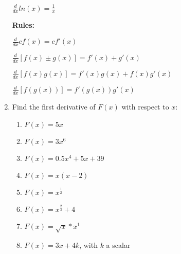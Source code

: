 \documentclass[11pt]{article}
\begin{document}
\begin{enumerate}
\begin{tcolorbox}[title= {\bf Helpful Derivative Formulae:}]
\begin{multicols}{2}
        \vspace{5mm}
        $\frac{d}{dx} ln(x) = \frac{1}{x}$ 


        \columnbreak

        {\bf Rules:}

        \vspace{5mm}
        $\frac{d}{dx} cf(x) = cf'(x)$

        \vspace{5mm}
        $\frac{d}{dx} [f(x) \pm g(x)] = f'(x) + g'(x)$

        \vspace{5mm}
        $\frac{d}{dx} [f(x) g(x)] = f'(x)g(x) + f(x)g'(x)$

        \vspace{5mm}
        $\frac{d}{dx} [f(g(x))] = f'(g(x)) g'(x)$
    \end{multicols}
    \vspace{-2mm}
  \end{tcolorbox}

  \item Find the first derivative of $F(x)$ with respect to $x$:
  \begin{multicols}{2}
    \begin{enumerate}
      \item $F(x) = 5x$
      
      \vspace{25mm}
      \item $F(x) = 3x^6$
      
      \vspace{25mm}
      \item $F(x) = 0.5x^4 + 5x + 39$
      
      \vspace{25mm}
      \item $F(x) = x(x-2)$
      
      \vspace{25mm}
      \item $F(x) = x^{\frac{1}{2}}$
      
      \vspace{25mm}
      \item $F(x) = x^{\frac{2}{3}} + 4$
      
      \vspace{25mm}
      \item $F(x) = \sqrt{x} * x^1$
      
      \vspace{25mm}
      \item $F(x) = 3x + 4k$, with $k$ a scalar
    \end{enumerate}
  \end{multicols}



\end{enumerate}
\end{document}
